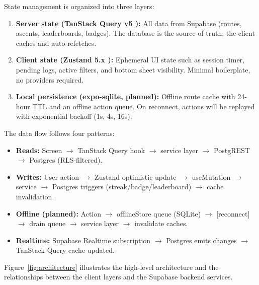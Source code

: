 \documentclass[12pt,a4paper]{report}
\renewcommand\_{\textunderscore\hspace{0pt}}
\begin{document}
State management is organized into three layers:

\begin{enumerate}[noitemsep]
    \item \textbf{Server state (TanStack Query v5 \cite{TaDo25}):} All data from Supabase (routes, ascents, leaderboards, badges). The database is the source of truth; the client caches and auto-refetches.
    \item \textbf{Client state (Zustand 5.x \cite{ZuDo25}):} Ephemeral UI state such as session timer, pending logs, active filters, and bottom sheet visibility. Minimal boilerplate, no providers required.
    \item \textbf{Local persistence (expo-sqlite, planned):} Offline route cache with 24-hour TTL and an offline action queue. On reconnect, actions will be replayed with exponential backoff (1s, 4s, 16s).
\end{enumerate}

The data flow follows four patterns:

\begin{itemize}[noitemsep]
    \item \textbf{Reads:} Screen $\rightarrow$ TanStack Query hook $\rightarrow$ service layer $\rightarrow$ PostgREST $\rightarrow$ Postgres (RLS-filtered).
    \item \textbf{Writes:} User action $\rightarrow$ Zustand optimistic update $\rightarrow$ useMutation $\rightarrow$ service $\rightarrow$ Postgres triggers (streak/badge/leaderboard) $\rightarrow$ cache invalidation.
    \item \textbf{Offline (planned):} Action $\rightarrow$ offlineStore queue (SQLite) $\rightarrow$ [reconnect] $\rightarrow$ drain queue $\rightarrow$ service layer $\rightarrow$ invalidate caches.
    \item \textbf{Realtime:} Supabase Realtime subscription $\rightarrow$ Postgres emits changes $\rightarrow$ TanStack Query cache updated.
\end{itemize}

Figure~\ref{fig:architecture} illustrates the high-level architecture and the relationships between the client layers and the Supabase backend services.
\end{document}
